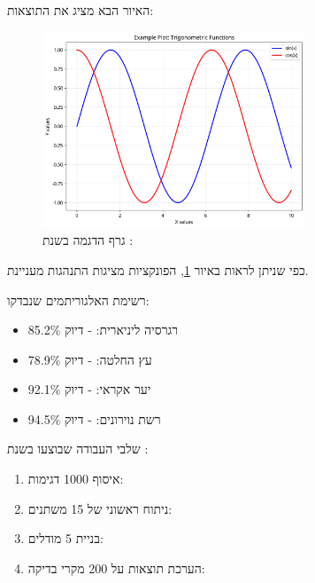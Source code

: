 \documentclass{hebrew-academic-template}
\begin{document}


האיור הבא מציג את התוצאות:

\begin{figure}[h]
\centering
\includegraphics[width=0.7\textwidth]{example_plot.png}
\caption{גרף הדגמה בשנת : }
\label{fig:example}
\end{figure}

כפי שניתן לראות באיור \ref{fig:example}, הפונקציות מציגות התנהגות מעניינת.



רשימת האלגוריתמים שנבדקו:

\begin{itemize}
\item רגרסיה ליניארית:  - דיוק \num{85.2}\%
\item עץ החלטה:  - דיוק \num{78.9}\%
\item יער אקראי:  - דיוק \num{92.1}\%
\item רשת נוירונים:  - דיוק \num{94.5}\%
\end{itemize}

שלבי העבודה שבוצעו בשנת :

\begin{enumerate}
\item איסוף \num{1000} דגימות: 
\item ניתוח ראשוני של \num{15} משתנים: 
\item בניית \num{5} מודלים: 
\item הערכת תוצאות על \num{200} מקרי בדיקה: 
\end{enumerate}
\end{document}
